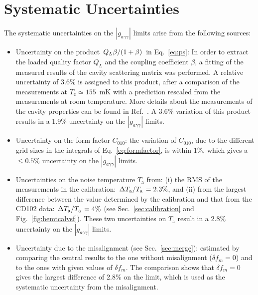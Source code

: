 \documentclass[%
reprint, %
superscriptaddress,
 amsmath,amssymb,
 aps
]{revtex4-2}
\begin{document}
\section{Systematic Uncertainties} \label{sec:sys}
The systematic uncertainties on the $\left|g_{a\gamma\gamma}\right|$ limits 
arise from the following sources:
\begin{itemize}
\item Uncertainty on the product 
$\left.Q_L\beta\middle/\left(1+\beta\right)\right.$ in Eq.~\eqref{eq:ps}: 
In order to extract the loaded quality factor $Q_L$ and the coupling 
coefficient $\beta$, a fitting of the measured results of the cavity 
scattering matrix was performed. A relative uncertainty of 3.6\% is 
assigned to this product, after a comparison of the measurements at 
$T_\text{c}\simeq155$~mK with a prediction rescaled from the measurements 
at room temperature. More details about the measurements of the 
cavity properties can be found in Ref.~\cite{TASEHInstrumentation}. 
A 3.6\% variation of this product results in a 1.9\% uncertainty 
on the $\left|g_{a\gamma\gamma}\right|$ limits. 

\item Uncertainty on the form factor $C_{010}$: 
the variation of $C_{010}$, due to the different grid sizes in the integrals 
of Eq.~\eqref{eq:formfactor}, is within 1\%, which gives a $\leq 0.5$\% 
uncertainty on the $\left|g_{a\gamma\gamma}\right|$ limits.

\item Uncertainties on the noise temperature $T_\text{a}$ from: (i) the RMS of 
the measurements in the calibration: 
$\left. \Delta T_\text{a}\middle/T_\text{a}\right.= 2.3\%$,  
and (ii) from the largest difference 
between the value determined by the calibration and that from the CD102 
data: $\left. \Delta T_\text{a}\middle/T_\text{a}\right.= 4\%$ 
(see Sec.~\ref{sec:calibration} and Fig.~\ref{fig:hemtcalvsf}). 
These two uncertainties on $T_\text{a}$ result in a 2.8\% uncertainty 
on the $\left|g_{a\gamma\gamma}\right|$ limits. 


\item Uncertainty due to the misalignment (see Sec.~\ref{sec:merge}):
  estimated by comparing the central results to the one without misalignment
  ($\delta f_m = 0$)
  and to the ones with given values of $\delta f_m$.
  The comparison shows that $\delta f_m = 0$ gives the largest difference 
  of 2.8\% on the limit, which is used as the systematic uncertainty from the 
  misalignment.
  

\end{itemize}
\end{document}

